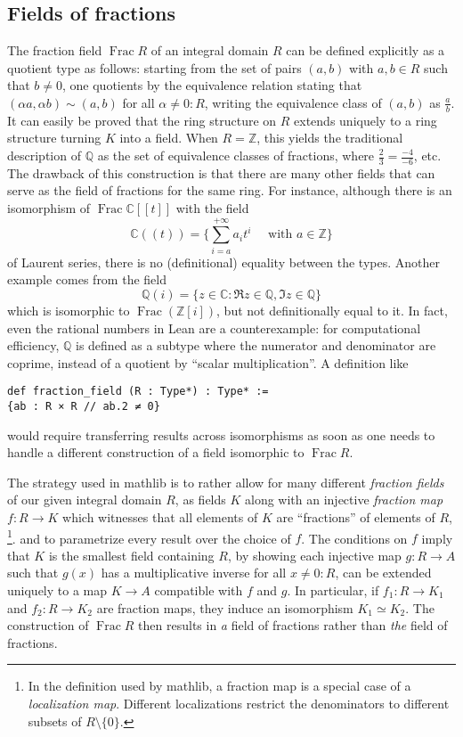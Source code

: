\documentclass[a4paper,USenglish,cleveref, autoref, thm-restate]{lipics-v2021}
\newcommand{\C}{\mathbb{C}}
\newcommand{\mathlib}{\textsf{mathlib}\xspace}
\newcommand{\Q}{\mathbb{Q}}
\newcommand{\Z}{\mathbb{Z}}
\DeclareMathOperator{\Frac}{Frac}
\begin{document}
\subsection{Fields of fractions}\label{subsection : fields of fractions}
The fraction field $\Frac R$ of an integral domain $R$ can be defined explicitly as a quotient type as follows:
starting from the set of pairs $(a,b)$ with $a,b \in R$ such that $b\neq 0$,
one quotients by the equivalence relation stating that $(\alpha a, \alpha b) \sim (a,b)$ for all $\alpha \ne 0 : R$, writing the equivalence class of $(a,b)$ as $\frac{a}{b}$.
It can easily be proved that the ring structure on $R$ extends uniquely to a ring structure turning $K$ into a field.
When $R=\Z$, this yields the traditional description of $\Q$ as the set of equivalence classes of fractions, where $\frac{2}{3}=\frac{-4}{-6}$, etc.
The drawback of this construction is that there are many other fields that can serve as the field of fractions for the same ring.
For instance, although there is an isomorphism of $\Frac \C[\![t]\!]$ with the field
\[
\C(\!(t)\!)=\Big\{\sum_{i=a}^{+\infty} a_it^i\quad\text{ with }a \in \Z\Big\}
\]
of Laurent series, there is no (definitional) equality between the types. Another example comes from the field
\[
\Q(i)=\{z \in \C : \Re z \in \Q, \Im z\in\Q\}
\]
which is isomorphic to $\Frac (\Z[i])$, but not definitionally equal to it.
In fact, even the rational numbers in Lean are a counterexample:
for computational efficiency, $\Q$ is defined as a subtype where the numerator and denominator are coprime,
instead of a quotient by ``scalar multiplication''. A definition like
\begin{lstlisting}
def fraction_field (R : Type*) : Type* :=
{ab : R × R // ab.2 ≠ 0}
\end{lstlisting}
would require transferring results across isomorphisms as soon as one needs to handle a different construction of a field isomorphic to $\Frac R$.

The strategy used in \mathlib is to rather allow for many different \emph{fraction fields} of our given integral domain $R$,
as fields $K$ along with an injective \emph{fraction map} $f : R \to K$ which witnesses that all elements of $K$ are ``fractions'' of elements of $R$,%
\footnote{In the definition used by \mathlib, a fraction map is a special case of a \emph{localization map}. Different localizations restrict the denominators to different subsets of $R \setminus \{0\}$.}.
and to parametrize every result over the choice of $f$.
The conditions on $f$ imply that $K$ is the smallest field containing $R$,
by showing each injective map $g : R \to A$ such that $g(x)$ has a multiplicative inverse for all $x \ne 0 : R$,
can be extended uniquely to a map $K \to A$ compatible with $f$ and $g$.
In particular, if $f_1 : R \to K_1$ and $f_2 : R \to K_2$ are fraction maps, they induce an isomorphism $K_1 \simeq K_2$.
The construction of $\Frac R$ then results in \emph{a} field of fractions rather than \emph{the} field of fractions.
\end{document}
